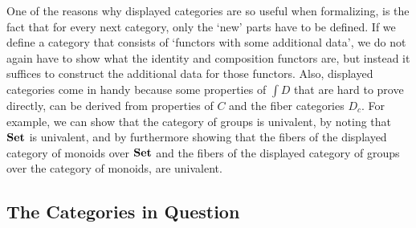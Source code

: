 One of the reasons why displayed categories are so useful when formalizing, is the fact that for every next category, only the `new' parts have to be defined. If we define a category that consists of `functors with some additional data', we do not again have to show what the identity and composition functors are, but instead it suffices to construct the additional data for those functors. Also, displayed categories come in handy because some properties of $ \int D $ that are hard to prove directly, can be derived from properties of $ C $ and the fiber categories $ D_c $. For example, we can show that the category of groups is univalent, by noting that $ \mathbf{Set} $ is univalent, and by furthermore showing that the fibers of the displayed category of monoids over $ \mathbf{Set} $ and the fibers of the displayed category of groups over the category of monoids, are univalent.

\subsection{The Categories in Question}\label{subsec:formalized-categories}

